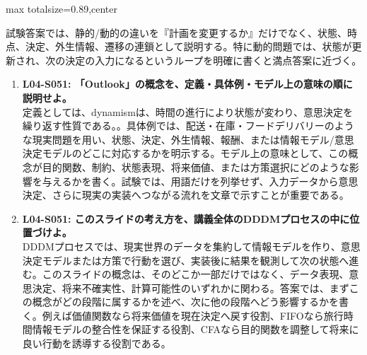 \begin{minipage}[t]{0.58\textwidth}
\begin{adjustbox}{max totalsize={\textwidth}{0.89\textheight},center}
\begin{minipage}{\textwidth}
試験答案では、静的/動的の違いを『計画を変更するか』だけでなく、状態、時点、決定、外生情報、遷移の連鎖として説明する。特に動的問題では、状態が更新され、次の決定の入力になるというループを明確に書くと満点答案に近づく。\par{}\begin{enumerate}\item \textbf{L04-S051: 「Outlook」の概念を、定義・具体例・モデル上の意味の順に説明せよ。}\\定義としては、dynamismは、時間の進行により状態が変わり、意思決定を繰り返す性質である。。具体例では、配送・在庫・フードデリバリーのような現実問題を用い、状態、決定、外生情報、報酬、または情報モデル/意思決定モデルのどこに対応するかを明示する。モデル上の意味として、この概念が目的関数、制約、状態表現、将来価値、または方策選択にどのような影響を与えるかを書く。試験では、用語だけを列挙せず、入力データから意思決定、さらに現実の実装へつながる流れを文章で示すことが重要である。\item \textbf{L04-S051: このスライドの考え方を、講義全体のDDDMプロセスの中に位置づけよ。}\\DDDMプロセスでは、現実世界のデータを集約して情報モデルを作り、意思決定モデルまたは方策で行動を選び、実装後に結果を観測して次の状態へ進む。このスライドの概念は、そのどこか一部だけではなく、データ表現、意思決定、将来不確実性、計算可能性のいずれかに関わる。答案では、まずこの概念がどの段階に属するかを述べ、次に他の段階へどう影響するかを書く。例えば価値関数なら将来価値を現在決定へ戻す役割、FIFOなら旅行時間情報モデルの整合性を保証する役割、CFAなら目的関数を調整して将来に良い行動を誘導する役割である。\end{enumerate}
\end{minipage}
\end{adjustbox}
\end{minipage}

